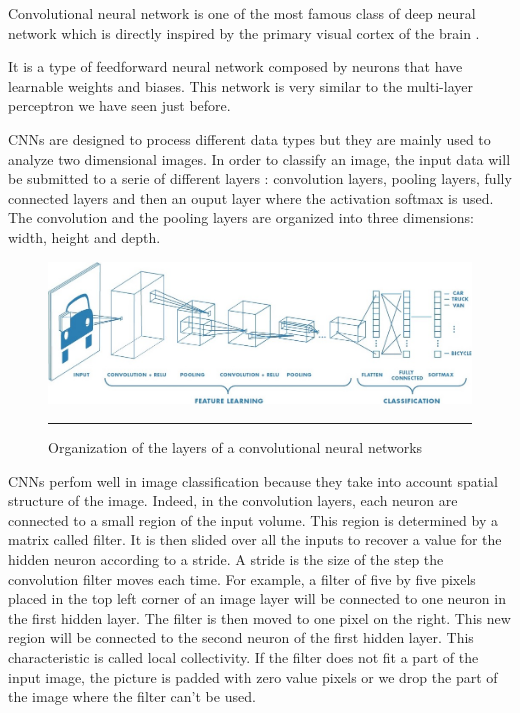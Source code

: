 Convolutional neural network is one of the most famous class of deep neural network which is directly inspired by the primary visual cortex of the brain \cite{CNN}.  

It is a type of feedforward neural network composed by neurons that have learnable weights and biases. This network is very similar to the multi-layer perceptron we have seen just before.

CNNs are designed to process different data types but they are mainly used to analyze two dimensional images. In order to classify an image, the input data will be submitted to a serie of different layers : convolution layers, pooling layers, fully connected layers and then an ouput layer where the activation softmax is used. The convolution and the pooling layers are organized into three dimensions: width, height and depth.

\begin{figure}[H]
  \centering
    \includegraphics[width=\textwidth]{Figures/convol.jpeg}
    \rule{35em}{0.5pt}
  \caption[Schema of CNN]{Organization of the layers of a convolutional neural networks}
  \label{fig:Muli-layer perceptron}
\end{figure}


CNNs perfom well in image classification because they take into account spatial structure of the image. Indeed, in the convolution layers, each neuron are connected to a small region of the input volume. This region is determined by a matrix called filter. It is then slided over all the inputs to recover a value for the hidden neuron according to a stride. A stride is the size of the step the convolution filter moves each time. For example, a filter of five by five pixels placed in the top left corner of an image layer will be connected to one neuron in the first hidden layer. The filter is then moved to one pixel on the right. This new region will be connected to the second neuron of the first hidden layer. This characteristic is called local collectivity. If the filter does not fit a part of the input image, the picture is padded with zero value pixels or we drop the part of the image where the filter can't be used. 


